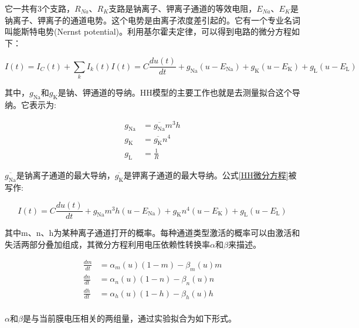 \documentclass[12pt, a4paper, oneside]{ctexbook}
\begin{document}
它一共有3个支路，$R_{Na}、R_{K}$支路是钠离子、钾离子通道的等效电阻，$E_{Na}、E_{K}$是钠离子、钾离子的通道电势。这个电势是由离子浓度差引起的。它有一个专业名词叫能斯特电势(Nernst potential)。利用基尔霍夫定律，可以得到电路的微分方程如下：

\begin{equation}
    I(t)=I_C(t)+\sum_k I_k(t)
    I(t)=C\frac{du(t)}{dt}+g_{\text{Na}}(u-E_{\text{Na}})+g_{\text{K}}(u-E_{\text{K}})+g_{\text{L}}(u-E_{\text{L}})
    \label{HH微分方程}
\end{equation}

其中，$g_{\text{Na}}$和$g_{\text{K}}$是钠、钾通道的导纳。HH模型的主要工作也就是去测量拟合这个导纳。它表示为:

\begin{equation}
    \begin{aligned}
        g_{\text{Na}}&=\overline{g_{\text{Na}}}m^3h\\
        g_{\text{K}}&=\overline{g_{\text{K}}}n^4\\
        g_{\text{L}}&=\frac{1}{R}
    \end{aligned}
\end{equation}

$\overline{g_{\text{Na}}}$是钠离子通道的最大导纳，$\overline{g_{\text{K}}}$是钾离子通道的最大导纳。公式\ref*{HH微分方程}被写作:

\begin{equation}
    I(t)=C\frac{du(t)}{dt}+g_{\text{Na}}m^3h\left(u-E_{\text{Na}}\right)+g_{\text{K}}n^4\left(u-E_{\text{K}}\right)+g_{\text{L}}\left(u-E_{\text{L}}\right)
\end{equation}

其中m、n、h为某种离子通道打开的概率。每种通道类型激活的概率可以由激活和失活两部分叠加组成，其微分方程利用电压依赖性转换率$\alpha$和$\beta$来描述。

\begin{equation}
    \begin{aligned}
        \frac{dm}{dt}&=\alpha_m(u)(1-m)-\beta_m(u)m\\
        \frac{dn}{dt}&=\alpha_n(u)(1-n)-\beta_n(u)n\\
        \frac{dh}{dt}&=\alpha_h(u)(1-h)-\beta_h(u)h\\
    \end{aligned}
\end{equation}

$\alpha$和$\beta$是与当前膜电压相关的两组量，通过实验拟合为如下形式。\\
\end{document}
